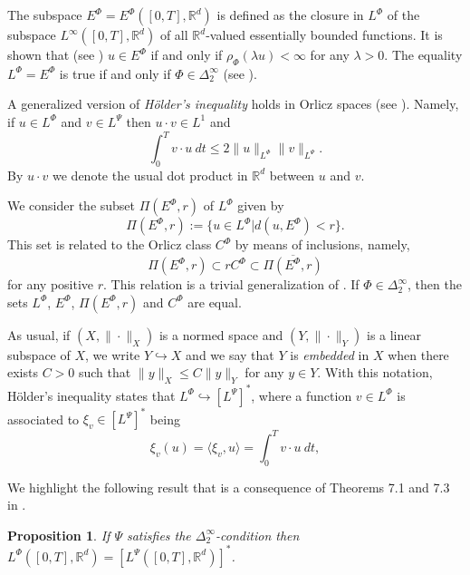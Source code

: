 \documentclass[twoside]{article}
\newtheorem{prop}[thm]{Proposition}
\theoremstyle{remark}
\newcommand{\orlnor}{\|_{L^{\Phi}}}
\newcommand{\lphi}{L^{\Phi}}
\newcommand{\lpsi}{L^{\Psi}}
\newcommand{\ephi}{E^{\Phi}}
\newcommand{\claseor}{C^{\Phi}}
\newcommand{\rr}{\mathbb{R}}
\renewcommand{\leq}{\leqslant}
\begin{document}
The subspace $\ephi=\ephi\left([0,T],\rr^d\right)$ is defined as the closure in $\lphi$ of the subspace $L^{\infty}\left([0,T],\rr^d\right)$ of all $\mathbb{R}^d$-valued essentially bounded functions. It is shown that  (see \cite[Thm. 5.1]{Orliczvectorial2005}) $u\in\ephi$  if and only if $\rho_{\Phi}(\lambda u)<\infty$ for any $\lambda>0$. The equality $\lphi=\ephi$ is true if and only if $\Phi\in\Delta_2^{\infty}$ (see \cite[Thm. 5.2]{Orliczvectorial2005}). 

A generalized version of \emph{H\"older's inequality} holds in Orlicz spaces (see \cite[Thm. 7.2]{Orliczvectorial2005}). Namely, if $u\in\lphi$ and $v\in\lpsi$ then $u\cdot v\in L^1$ and
\begin{equation}\label{holder}
\int_0^Tv\cdot u\ dt\leq 2 \|u\orlnor\|v\|_{L^{\Psi}}.
\end{equation}
By $u\cdot v$ we denote the usual dot product in $\mathbb{R}^{d}$ between $u$ and $v$.

We consider the subset $\Pi(\ephi,r)$ of $\lphi$ given by
\[\Pi(\ephi,r):=\{u\in\lphi| d(u,\ephi)<r\}.\]
This set is related to the Orlicz class $\claseor$ by means of inclusions, namely,
\begin{equation}\label{eq:inclusiones}\Pi(\ephi, r )\subset r \claseor\subset\overline{\Pi(\ephi,r)}
\end{equation}
for any positive $r$. This relation is a trivial generalization of  \cite[Thm. 5.6]{Orliczvectorial2005}.
If $\Phi \in \Delta_2^{\infty}$,  then the sets $\lphi$, $\ephi$, $\Pi(\ephi,r)$ and $\claseor$ are equal.
 
As usual, if $(X,\|\cdot\|_X)$ is a normed space and $(Y,\|\cdot \|_Y)$ is a linear subspace of $X$,  we write $Y\hookrightarrow X$ and we say that $Y$ is \emph{embedded} in $X$  when there exists $C>0$ such that
$\|y\|_X\leq C\|y\|_Y$ for any $y\in Y$.  With this notation, H\"older's inequality states that  $\lphi\hookrightarrow  \left[\lpsi\right]^*$, where a function $v\in\lphi$ is associated  to $\xi_v\in \left[\lpsi\right]^*$ being
\begin{equation}\label{pairing}
  \xi_v(u)=\langle \xi_v,u\rangle=\int_0^Tv\cdot u\ dt,
\end{equation}

We highlight the following result that is a consequence of Theorems 7.1 and 7.3 in  \cite{Orliczvectorial2005}.

\begin{prop} If $\Psi$ satisfies the $\Delta_2^{\infty}$-condition then $\lphi\left([0,T],\rr^d\right)=\left[\lpsi\left([0,T],\rr^d\right)\right]^*$.  
 
\end{prop}
\end{document}
